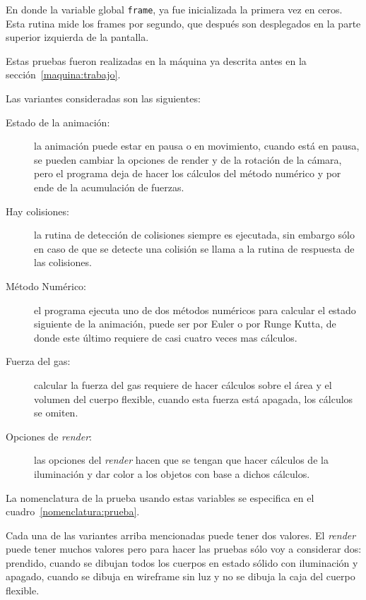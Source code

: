 En donde la variable global \verb|frame|, ya fue inicializada la primera vez en ceros.
Esta rutina mide los frames por segundo, que después son desplegados en la parte superior izquierda de la pantalla.

Estas pruebas fueron realizadas en la máquina ya descrita antes en la sección~\ref{maquina:trabajo}.

Las variantes consideradas son las siguientes:

\begin{description}
 \item[Estado de la animación:]la animación puede estar en pausa o en movimiento, cuando está en pausa, se pueden cambiar la opciones de render y de la rotación de la cámara, pero el programa deja de hacer los cálculos del método numérico y por ende de la acumulación de fuerzas.
 \item[Hay colisiones:]la rutina de detección de colisiones siempre es ejecutada, sin embargo sólo en caso de que se detecte una colisión se llama a la rutina de respuesta de las colisiones.
 \item[Método Numérico:]el programa ejecuta uno de dos métodos numéricos para calcular el estado siguiente de la animación, puede ser por Euler o por Runge Kutta, de donde este último requiere de casi cuatro veces mas cálculos.
 \item[Fuerza del gas:]calcular la fuerza del gas requiere de hacer cálculos sobre el área y el volumen del cuerpo flexible, cuando esta fuerza está apagada, los cálculos se omiten.
 \item[Opciones de \emph{\foreignlanguage{english}{render}}:]las opciones del \emph{\foreignlanguage{english}{render}} hacen que se tengan que hacer cálculos de la iluminación y dar color a los objetos con base a dichos cálculos.
\end{description}

La nomenclatura de la prueba usando estas variables se especifica en el cuadro~\ref{nomenclatura:prueba}.

Cada una de las variantes arriba mencionadas puede tener dos valores.
El \emph{\foreignlanguage{english}{render}} puede tener muchos valores pero para hacer las pruebas sólo voy a considerar dos: prendido, cuando se dibujan todos los cuerpos en estado sólido con iluminación y apagado, cuando se dibuja en wireframe sin luz y no se dibuja la caja del cuerpo flexible.

